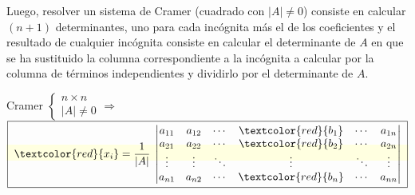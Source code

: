  Luego, resolver un sistema de Cramer (cuadrado con $|A|\neq 0$) consiste en calcular $(n+1)$ determinantes, uno para cada incógnita más el de los coeficientes y el resultado de cualquier incógnita consiste en calcular el determinante de $A$ en que se ha sustituido la columna correspondiente a la incógnita a calcular por la columna de términos independientes y dividirlo por el determinante de $A$.
 
\noindent Cramer $\begin{cases} n \times n \\ |A|\neq 0 \end{cases} \Rightarrow \;$ \colorbox{LightYellow}{$  \boxed{\; \textcolor{red}{x_i}= \dfrac 1 {|A|}\; \left| \begin{matrix} 
a_{11}& a_{12}& \cdots & \textcolor{red}{b_1} & \cdots & a_{1n} \\
a_{21}& a_{22}& \cdots & \textcolor{red}{b_2} & \cdots & a_{2n} \\
\vdots & \vdots & \ddots & \vdots & \ddots & \vdots \\
a_{n1}& a_{n2}& \cdots & \textcolor{red}{b_n} & \cdots & a_{nn} \\
 \end{matrix} \right|\;}$}
 
